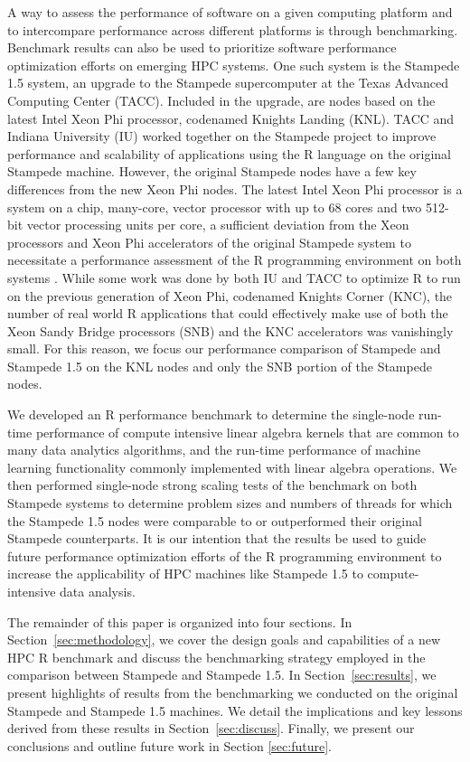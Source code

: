 A way to assess the performance of software on a given computing platform and to intercompare
  performance across different platforms is through benchmarking.
Benchmark results can also be used to prioritize software performance optimization efforts on
  emerging HPC systems.
One such system is the Stampede 1.5 system, an upgrade to the Stampede supercomputer at the
  Texas Advanced Computing Center (TACC).  
Included in the upgrade, are nodes based on the latest Intel Xeon Phi processor,
  codenamed Knights Landing (KNL).
TACC and Indiana University (IU) worked together on the Stampede project to
  improve performance and scalability of applications using the R language on the original
  Stampede machine.
However, the original Stampede nodes have a few key differences from
  the new Xeon Phi nodes.
The latest Intel Xeon Phi processor is a system on a chip, many-core, vector
  processor with up to 68 cores and two 512-bit vector processing units per core, a sufficient
  deviation from the Xeon processors and Xeon Phi accelerators of the original
  Stampede system to necessitate a performance assessment of the R programming environment
  on both systems \cite{tacc:stampedeGuide}.
While some work was done by both IU and TACC to optimize R to run on the previous generation
  of Xeon Phi\cite{zou:2014high}, codenamed Knights Corner (KNC), the number of real world R
  applications that could effectively make use of both the Xeon Sandy Bridge processors (SNB)
  and the KNC accelerators was vanishingly small.
For this reason, we focus our performance comparison of Stampede and Stampede 1.5 on the
  KNL nodes and only the SNB portion of the Stampede nodes.

We developed an R performance benchmark to determine the single-node run-time performance
of compute intensive linear algebra kernels that are common to many data analytics
algorithms, and the run-time performance of machine learning functionality commonly
implemented with linear algebra operations.  We then performed single-node strong scaling
tests of the benchmark on both Stampede systems to determine problem sizes and numbers of
threads for which the Stampede 1.5 nodes were comparable to or outperformed their original
Stampede counterparts.  It is our intention that the results be used to guide future
performance optimization efforts of the R programming environment to increase the
applicability of HPC machines like Stampede 1.5 to compute-intensive data analysis.

The remainder of this paper is organized into four sections.  In Section~\ref{sec:methodology},
we cover the design goals and capabilities of a new HPC R benchmark and discuss the
benchmarking strategy employed in the comparison between Stampede and Stampede 1.5.
In Section~\ref{sec:results}, we present highlights of results from the benchmarking we
conducted on the original Stampede and Stampede 1.5 machines.  We detail the implications
and key lessons derived from these results in Section~\ref{sec:discuss}.  Finally, we present our
conclusions and outline future work in Section \ref{sec:future}.

